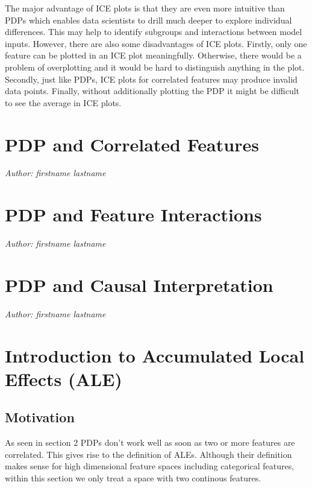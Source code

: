 \documentclass[
]{krantz}
\begin{document}
The major advantage of ICE plots is that they are even more intuitive than PDPs which enables data scientists to drill much deeper to explore individual differences. This may help to identify subgroups and interactions between model inputs. However, there are also some disadvantages of ICE plots. Firstly, only one feature can be plotted in an ICE plot meaningfully. Otherwise, there would be a problem of overplotting and it would be hard to distinguish anything in the plot. Secondly, just like PDPs, ICE plots for correlated features may produce invalid data points. Finally, without additionally plotting the PDP it might be difficult to see the average in ICE plots.\citep{molnar2019}

\hypertarget{pdp-and-correlated-features}{%
\chapter{PDP and Correlated Features}\label{pdp-and-correlated-features}}

\emph{Author: firstname lastname}

\hypertarget{pdp-and-feature-interactions}{%
\chapter{PDP and Feature Interactions}\label{pdp-and-feature-interactions}}

\emph{Author: firstname lastname}

\hypertarget{pdp-and-causal-interpretation}{%
\chapter{PDP and Causal Interpretation}\label{pdp-and-causal-interpretation}}

\emph{Author: firstname lastname}

\hypertarget{introduction-to-accumulated-local-effects-ale}{%
\chapter{Introduction to Accumulated Local Effects (ALE)}\label{introduction-to-accumulated-local-effects-ale}}

\hypertarget{motivation}{%
\section{Motivation}\label{motivation}}

As seen in section 2 PDPs don't work well as soon as two or more features are correlated. This gives rise to the definition of ALEs. Although their definition makes sense for high dimensional feature spaces including categorical features, within this section we only treat a space with two continous features.
\end{document}
